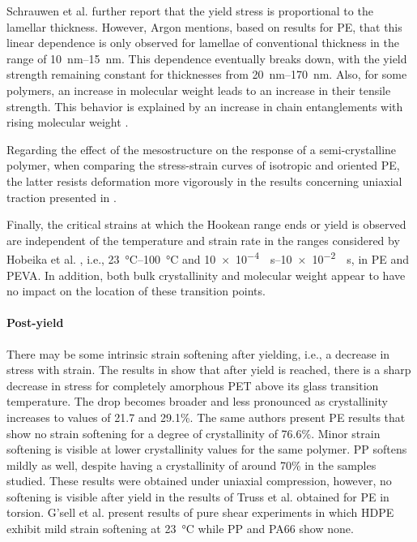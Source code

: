 Schrauwen et al. \citep{schrauwenIntrinsicDeformationBehavior2004} further report that the yield stress is proportional to the lamellar thickness.
However, Argon \citep{argonPhysicsDeformationFracture2013a} mentions, based on results for PE, that this linear dependence is only observed for lamellae of conventional thickness in the range of \SIrange{10}{15}{\nano\meter}.
This dependence eventually breaks down, with the yield strength remaining constant for thicknesses from \SIrange{20}{170}{\nano\meter}.
Also, for some polymers, an increase in molecular weight leads to an increase in their tensile strength.
This behavior is explained by an increase in chain entanglements with rising molecular weight \citep{callister2014materials}.

Regarding the effect of the mesostructure on the response of a semi-crystalline polymer, when comparing the stress-strain curves of isotropic and oriented PE, the latter resists deformation more vigorously in the results concerning uniaxial traction presented in \cite{naViscousForceDominatedTensileDeformation2006}.

Finally, the critical strains at which the Hookean range ends or yield is observed are independent of the temperature and strain rate in the ranges considered by Hobeika et al. \citep{hobeikaTemperatureStrainRate2000}, i.e., \SIrange{23}{100}{\celsius} and \SIrange{10e-4}{10e-2}{\per\second}, in PE and PEVA.
In addition, both bulk crystallinity and molecular weight appear to have no impact on the location of these transition points.

\paragraph{Post-yield}
There may be some intrinsic strain softening after yielding, i.e., a decrease in stress with strain.
The results in \cite{schrauwenIntrinsicDeformationBehavior2004} show that after yield is reached, there is a sharp decrease in stress for completely amorphous PET above its glass transition temperature.
The drop becomes broader and less pronounced as crystallinity increases to values of 21.7 and 29.1\%.
The same authors present PE results that show no strain softening for a degree of crystallinity of 76.6\%.
Minor strain softening is visible at lower crystallinity values for the same polymer.
PP softens mildly as well, despite having a crystallinity of around 70\% in the samples studied.
These results were obtained under uniaxial compression, however, no softening is visible after yield in the results of Truss et al. \cite{trussEffectHydrostaticPressure1981} obtained for PE in torsion.
G'sell et al. \citep{gsellApplicationPlaneSimple1983} present results of pure shear experiments in which HDPE exhibit mild strain softening at \SI{23}{\celsius} while PP and PA66 show none.

